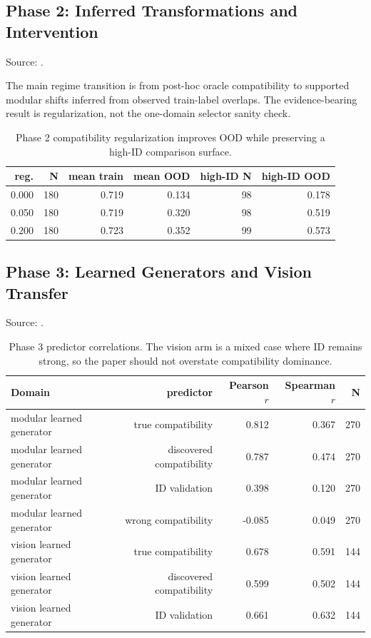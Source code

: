 \subsection{Phase 2: Inferred Transformations and Intervention}

Source:
.

The main regime transition is from post-hoc oracle compatibility to supported
modular shifts inferred from observed train-label overlaps. The evidence-bearing
result is regularization, not the one-domain selector sanity check.

\begin{table}[h]
\centering
\small
\begin{tabular}{rrrrrr}
\toprule
reg. & N & mean train & mean OOD & high-ID N & high-ID OOD \\
\midrule
0.000 & 180 & 0.719 & 0.134 & 98 & 0.178 \\
0.050 & 180 & 0.719 & 0.320 & 98 & 0.519 \\
0.200 & 180 & 0.723 & 0.352 & 99 & 0.573 \\
\bottomrule
\end{tabular}
\caption{Phase 2 compatibility regularization improves OOD while preserving a
high-ID comparison surface.}
\end{table}

\subsection{Phase 3: Learned Generators and Vision Transfer}

Source:
.

\begin{table}[h]
\centering
\small
\begin{tabular}{lrrrr}
\toprule
Domain & predictor & Pearson $r$ & Spearman $r$ & N \\
\midrule
modular learned generator & true compatibility & 0.812 & 0.367 & 270 \\
modular learned generator & discovered compatibility & 0.787 & 0.474 & 270 \\
modular learned generator & ID validation & 0.398 & 0.120 & 270 \\
modular learned generator & wrong compatibility & -0.085 & 0.049 & 270 \\
vision learned generator & true compatibility & 0.678 & 0.591 & 144 \\
vision learned generator & discovered compatibility & 0.599 & 0.502 & 144 \\
vision learned generator & ID validation & 0.661 & 0.632 & 144 \\
\bottomrule
\end{tabular}
\caption{Phase 3 predictor correlations. The vision arm is a mixed case where
ID remains strong, so the paper should not overstate compatibility dominance.}
\end{table}

